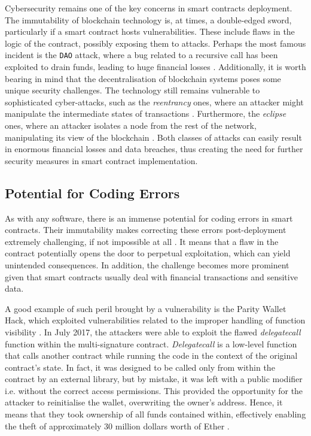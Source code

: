 Cybersecurity remains one of the key concerns in smart contracts deployment. The immutability of blockchain technology is, at times, a double-edged sword, particularly if a smart contract hosts vulnerabilities. These include flaws in the logic of the contract, possibly exposing them to attacks. Perhaps the most famous incident is the \texttt{DAO} attack, where a bug related to a recursive call has been exploited to drain funds, leading to huge financial losses \cite{DamianoEtAl2019, Durovic2021, KaiEtAl2021}. Additionally, it is worth bearing in mind that the decentralisation of blockchain systems poses some unique security challenges. The technology still remains vulnerable to sophisticated cyber-attacks, such as the \textit{reentrancy} ones, where an attacker might manipulate the intermediate states of transactions \cite{KaiEtAl2021}. Furthermore, the \textit{eclipse} ones, where an attacker isolates a node from the rest of the network, manipulating its view of the blockchain \cite{KaiEtAl2021}. Both classes of attacks can easily result in enormous financial losses and data breaches, thus creating the need for further security measures in smart contract implementation.

\subsection{Potential for Coding Errors}

As with any software, there is an immense potential for coding errors in smart contracts. Their immutability makes correcting these errors post-deployment extremely challenging, if not impossible at all \cite{Durovic2021}. It means that a flaw in the contract potentially opens the door to perpetual exploitation, which can yield unintended consequences. In addition, the challenge becomes more prominent given that smart contracts usually deal with financial transactions and sensitive data. 

A good example of such peril brought by a vulnerability is the Parity Wallet Hack, which exploited vulnerabilities related to the improper handling of function visibility \cite{ZhouEtAl2022}. In July 2017, the attackers were able to exploit the flawed \textit{delegatecall} function within the multi-signature contract. \textit{Delegatecall} is a low-level function that calls another contract while running the code in the context of the original contract's state. In fact, it was designed to be called only from within the contract by an external library, but by mistake, it was left with a public modifier i.e. without the correct access permissions. This provided the opportunity for the attacker to reinitialise the wallet, overwriting the owner's address. Hence, it means that they took ownership of all funds contained within, effectively enabling the theft of approximately 30 million dollars worth of Ether \cite{ZhouEtAl2022}. 

